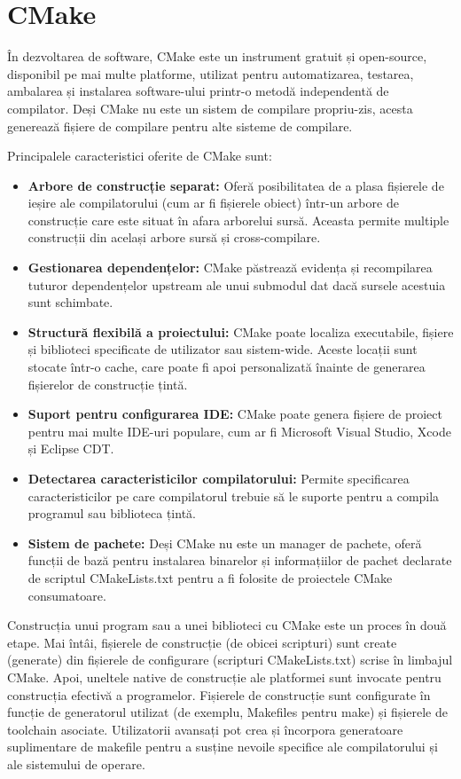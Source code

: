 \documentclass[a4paper,12pt]{report}
\begin{document}
\section{CMake}
În dezvoltarea de software, CMake este un instrument gratuit și open-source, disponibil pe mai multe platforme, utilizat pentru automatizarea, testarea, ambalarea și instalarea software-ului printr-o metodă independentă de compilator. Deși CMake nu este un sistem de compilare propriu-zis, acesta generează fișiere de compilare pentru alte sisteme de compilare.

Principalele caracteristici oferite de CMake sunt:
\begin{itemize}
    \item \textbf{Arbore de construcție separat:} Oferă posibilitatea de a plasa fișierele de ieșire ale compilatorului (cum ar fi fișierele obiect) într-un arbore de construcție care este situat în afara arborelui sursă. Aceasta permite multiple construcții din același arbore sursă și cross-compilare.
    \item \textbf{Gestionarea dependențelor:} CMake păstrează evidența și recompilarea tuturor dependențelor upstream ale unui submodul dat dacă sursele acestuia sunt schimbate.
    \item \textbf{Structură flexibilă a proiectului:} CMake poate localiza executabile, fișiere și biblioteci specificate de utilizator sau sistem-wide. Aceste locații sunt stocate într-o cache, care poate fi apoi personalizată înainte de generarea fișierelor de construcție țintă.
    \item \textbf{Suport pentru configurarea IDE:} CMake poate genera fișiere de proiect pentru mai multe IDE-uri populare, cum ar fi Microsoft Visual Studio, Xcode și Eclipse CDT.
    \item \textbf{Detectarea caracteristicilor compilatorului:} Permite specificarea caracteristicilor pe care compilatorul trebuie să le suporte pentru a compila programul sau biblioteca țintă.
    \item \textbf{Sistem de pachete:} Deși CMake nu este un manager de pachete, oferă funcții de bază pentru instalarea binarelor și informațiilor de pachet declarate de scriptul CMakeLists.txt pentru a fi folosite de proiectele CMake consumatoare.
\end{itemize}

Construcția unui program sau a unei biblioteci cu CMake este un proces în două etape. Mai întâi, fișierele de construcție (de obicei scripturi) sunt create (generate) din fișierele de configurare (scripturi CMakeLists.txt) scrise în limbajul CMake. Apoi, uneltele native de construcție ale platformei sunt invocate pentru construcția efectivă a programelor. Fișierele de construcție sunt configurate în funcție de generatorul utilizat (de exemplu, Makefiles pentru make) și fișierele de toolchain asociate. Utilizatorii avansați pot crea și încorpora generatoare suplimentare de makefile pentru a susține nevoile specifice ale compilatorului și ale sistemului de operare.
\end{document}
